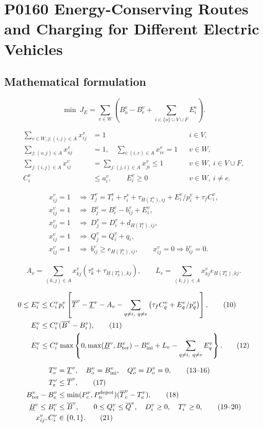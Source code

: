 \documentclass[10pt]{article}
\begin{document}
\section*{P0160 Energy-Conserving Routes and Charging for Different Electric Vehicles}
\subsection*{Mathematical formulation}
\[
\min\ J_E=\sum_{v\in W}\left(B_o^v-B_e^v+
 \sum_{i\in\{o\}\cup V\cup F}E_i^v\right).\tag{1}
\]

\begin{align}
\sum_{v\in W,j:(i,j)\in A}x_{ij}^v&=1 &&i\in V,\\
\sum_{j:(o,j)\in A}x_{oj}^v&=1,\quad \sum_{i:(i,e)\in A}x_{ie}^v=1 &&v\in W,\\
\sum_{j:(i,j)\in A}x_{ij}^v&=\sum_{j:(j,i)\in A}x_{ji}^v\le1
&&v\in W,\ i\in V\cup F,\\
C_i^v&\le a_i^v,\qquad E_i^v\ge0 &&v\in W,\ i\ne e.
\end{align}

\begin{align}
x_{ij}^v=1&\ \Longrightarrow\
T_j^v=T_i^v+\tau_i^s+\tau_{H(T_i^v),ij}+E_i^v/p_i^v+\tau_f C_i^v,\tag{5}\\
x_{ij}^v=1&\ \Longrightarrow\ B_j^v=B_i^v-b_{ij}^v+E_i^v,\tag{6}\\
x_{ij}^v=1&\ \Longrightarrow\ D_j^v=D_i^v+d_{H(T_i^v),ij},\tag{7}\\
x_{ij}^v=1&\ \Longrightarrow\ Q_j^v=Q_i^v+q_i,\tag{8}\\
x_{ij}^v=1&\ \Longrightarrow\ b_{ij}^v\ge e_{H(T_i^v),ij},
\qquad x_{ij}^v=0\Longrightarrow b_{ij}^v=0.\tag{9}
\end{align}

\[
A_v=\sum_{(k,j)\in A}x_{kj}^v(\tau_k^s+\tau_{H(T_k^v),kj}),\qquad
L_v=\sum_{(k,j)\in A}x_{kj}^v e_{H(T_k^v),kj}.
\]

\begin{align}
0\le E_i^v&\le C_i^vp_i^v
\left[\overline T^v-\underline T^v-A_v
-\sum_{q\ne i,\ q\ne e}\left(\tau_f C_q^v+E_q^v/p_q^v\right)\right],\tag{10}\\
E_i^v&\le C_i^v(\overline B^v-B_i^v),\tag{11}\\
E_i^v&\le C_i^v\max\left\{0,\max(\underline B^v,B_{\rm ter}^v)
-B_{\rm ini}^v+L_v-\sum_{q\ne i,\ q\ne e}E_q^v\right\}.\tag{12}
\end{align}

\begin{align}
T_o^v&=\underline T^v,\quad B_o^v=B_{\rm ini}^v,\quad Q_o^v=D_o^v=0,\tag{13--16}\\
T_e^v&\le\overline T^v,\tag{17}\\
B_{\rm ter}^v-B_e^v&\le
\min(P_c^v,P_n^{\rm depot})(\overline T_c^v-T_e^v),\tag{18}\\
\underline B^v\le B_i^v&\le\overline B^v,\qquad
0\le Q_i^v\le\overline Q^v,\quad D_i^v\ge0,\quad T_i^v\ge0,\tag{19--20}\\
x_{ij}^v,C_i^v&\in\{0,1\}.\tag{21}
\end{align}
\end{document}
